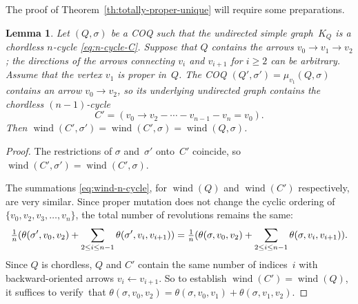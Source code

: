 \documentclass[11pt, letterpaper]{amsart}
\newtheorem{lemma}[theorem]{Lemma}
\theoremstyle{definition}
\numberwithin{equation}{section}
\def\wind{{\operatorname{wind}}}
\newcommand\GQ{K_Q}
\begin{document}
The proof of Theorem~\ref{th:totally-proper-unique} will require some preparations. 


\begin{lemma}
\label{lem:new cycle winding number}
Let $(Q,\sigma)$ be a COQ such that the undirected simple graph~$\GQ$ 
is a chordless $n$-cycle \eqref{eq:n-cycle-C}. 
Suppose that $Q$ contains the arrows $v_0 \rightarrow v_1 \rightarrow v_2$;
the directions of the arrows connecting $v_i$ and $v_{i+1}$ for $i\ge2$ can be arbitrary. 
Assume that the vertex $v_1$ is proper in~$Q$.
The COQ $(Q',\sigma')=\mu_{v_1}(Q,\sigma)$ contains an arrow $v_0 \rightarrow v_2$,  
so its underlying undirected graph contains the chordless $(n-1)$-cycle
\begin{equation*}
C'=(v_0 \rightarrow v_2 - \cdots -v_{n-1} - v_n = v_0). 
\end{equation*}
Then $\wind(C',\sigma') = \wind(C',\sigma) = \wind(Q,\sigma)$.
\end{lemma}

\begin{proof}
The restrictions of $\sigma$ and~$\sigma'$ onto~$C'$ coincide, so $\wind(C',\sigma') = \wind(C',\sigma)$.

The summations \eqref{eq:wind-n-cycle}, for $\wind(Q)$ and $\wind(C')$ respectively, are very similar. 
Since proper mutation does not change the cyclic ordering of $\{v_0, v_2, v_3, \ldots, v_n\}$, 
the total number of revolutions remains the same:
\begin{equation*}
\tfrac{1}{n} (\theta(\sigma', v_0, v_2) + \sum_{2 \leq i \leq n-1} \theta(\sigma', v_i, v_{i+1}))
=\tfrac{1}{n} (\theta(\sigma, v_0, v_2) + \sum_{2 \leq i \leq n-1} \theta(\sigma, v_i, v_{i+1})) .
\vspace{-3pt}
\end{equation*}
Since $Q$ is chordless, $Q$ and $C'$ contain the same number of indices~$i$ 
with backward-oriented arrows $v_i \leftarrow v_{i+1}$.
So to establish $\wind(C')=\wind(Q)$, it suffices to verify~that
$\theta(\sigma, v_0, v_2)  = \theta(\sigma, v_0, v_1) + \theta(\sigma, v_1, v_2)$. 
\end{proof}
\end{document}
